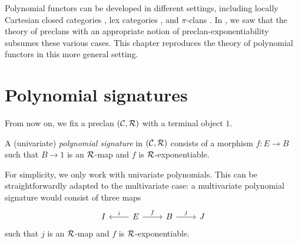 Polynomial functors can be developed in different settings,
including locally Cartesian closed categories \cite{gambino2013},
lex categories \cite{weber2015},
and $\pi$-clans \cite{hua2026}.
In ,
we saw that the theory of preclans
with an appropriate notion of preclan-exponentiability subsumes these various cases.
This chapter reproduces the theory of polynomial functors in this more general setting.

\section{Polynomial signatures}
From now on, we fix a preclan $(\mathcal{C},\mathcal{R})$ with a terminal object $1$.

\begin{definition}
  A (univariate) \emph{polynomial signature} in $(\mathcal{C},\mathcal{R})$ consists of
  a morphism $f : E \to B$ such that
  $B \to 1$ is an $\mathcal{R}$-map
  and $f$ is $\mathcal{R}$-exponentiable.
\end{definition}

For simplicity, we only work with univariate polynomials.
This can be straightforwardly adapted to the multivariate case:
a multivariate polynomial signature would consist of three maps
\[\begin{tikzcd}
	I & E & B & J
	\arrow["i"', from=1-2, to=1-1]
	\arrow["f", from=1-2, to=1-3]
	\arrow["j", from=1-3, to=1-4]
\end{tikzcd}\]
such that $j$ is an $\mathcal{R}$-map and $f$ is $\mathcal{R}$-exponentiable.

